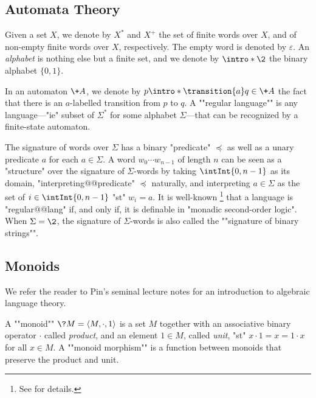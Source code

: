\subsection{Automata Theory}

Given a set $X$, we denote by $X^*$ and $X^+$ the set of finite words
over $X$, and of non-empty finite words over $X$, respectively.
The empty word is denoted by $\varepsilon$.
An \emph{alphabet} is nothing else but a finite set, and we denote by
$\intro*\2$ the binary alphabet $\{0,1\}$.

In an automaton $\+A$, we denote by \AP $p \intro*\transition{a} q \in \+A$
the fact that there is an $a$-labelled transition from $p$ to $q$.
A \AP""regular language"" is any language---"ie" subset of $\Sigma^*$ for some alphabet $\Sigma$---that
can be recognized by a finite-state automaton.

The signature of words over $\Sigma$ has a binary "predicate" $\preceq$
as well as a unary predicate $a$ for each $a\in \Sigma$.
A word $w_0 \cdots w_{n-1}$ of length $n$
can be seen as a "structure" over the signature of $\Sigma$-words
by taking $\intInt{0,n-1}$ as its domain, "interpreting@@predicate"
$\preceq$ naturally, and interpreting $a\in \Sigma$
as the set of $i \in \intInt{0,n-1}$ "st" $w_i = a$.
It is well-known%
\footnote{See  for details.}
that a language is "regular@@lang" if, and only if, it is definable in "monadic second-order logic".
When $\Sigma = \2$, the signature of $\Sigma$-words is also called 
the \AP""signature of binary strings"".

\subsection{Monoids}

We refer the reader to Pin's seminal lecture notes \cite{Pin2022MathematicalFoundations}
for an introduction to algebraic language theory.

A \AP""monoid"" $\?M = \tup{M,{\cdot},1}$ is a set $M$ together with an associative binary operator $\cdot$ called \emph{product}, and an element $1 \in M$, called \emph{unit}, "st" $x\cdot 1 = x = 1 \cdot x$ for all $x\in M$.
A \AP""monoid morphism"" is a function between monoids that preserve the product and unit.

